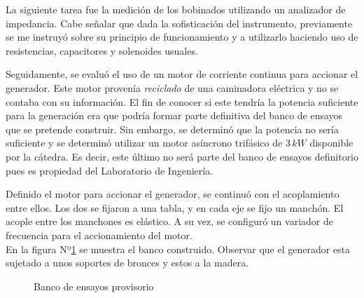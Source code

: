 \documentclass[a4paper,11pt,twoside]{IT-CNEA}
\begin{document}
\par La siguiente tarea fue la medición de los bobinados utilizando un analizador de impedancia. Cabe señalar que dada la sofisticación del instrumento, previamente se me instruyó sobre su principio de funcionamiento y a utilizarlo haciendo uso de resistencias, capacitores y solenoides usuales.
\par Seguidamente, se evaluó el uso de un motor de corriente continua para accionar el generador. Este motor provenía \textit{reciclado} de una caminadora eléctrica y no se contaba con su información. El fin de conocer si este tendría la potencia suficiente para la generación era que podría formar parte definitiva del banco de ensayos que se pretende construir. Sin embargo, se determinó que la potencia no sería suficiente y se determinó utilizar un motor asíncrono trifásico de $3\,kW$ disponible por la cátedra. Es decir, este último no será parte del banco de ensayos definitorio pues es propiedad del Laboratorio de Ingeniería. 
\par Definido el motor para accionar el generador, se continuó con el acoplamiento entre ellos. Los dos se fijaron a una tabla, y en cada eje se fijo un manchón. El acople entre los manchones es elástico. A su vez, se configuró un variador de frecuencia para el accionamiento del motor.
\\En la figura Nº\ref{fig:bancoEnsayoVistas} se muestra el banco construido.
Observar que el generador esta sujetado a unos soportes de bronces y estos a la madera. 
\begin{figure}[h!]
\centering
{}%
\hfill %
%
\caption{Banco de ensayos provisorio}
\label{fig:bancoEnsayoVistas}
\end{figure}
\end{document}
